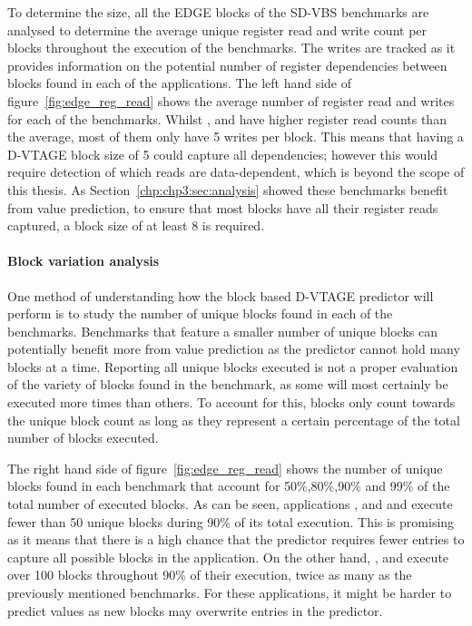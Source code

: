 To determine the size, all the EDGE blocks of the SD-VBS benchmarks are analysed to determine the average unique register read and write count per blocks throughout the execution of the benchmarks.
The writes are tracked as it provides information on the potential number of register dependencies between blocks found in each of the applications.
The left hand side of figure~\ref{fig:edge_reg_read} shows the average number of register read and writes for each of the benchmarks.
Whilst  ,  and  have higher register read counts than the average, most of them only have 5 writes per block.
This means that having a D-VTAGE block size of 5 could capture all dependencies; however this would require detection of which reads are data-dependent, which is beyond the scope of this thesis.
As Section~\ref{chp:chp3:sec:analysis} showed these benchmarks benefit from value prediction, to ensure that most blocks have all their register reads captured, a block size of at least 8 is required.

\paragraph*{Block variation analysis}



One method of understanding how the block based D-VTAGE predictor will perform is to study the number of unique blocks found in each of the benchmarks.
Benchmarks that feature a smaller number of unique blocks can potentially benefit more from value prediction as the predictor cannot hold many blocks at a time.
Reporting all unique blocks executed is not a proper evaluation of the variety of blocks found in the benchmark, as some will most certainly be executed more times than others.
To account for this, blocks only count towards the unique block count as long as they represent a certain percentage of the total number of blocks executed.

The right hand side of figure~\ref{fig:edge_reg_read} shows the number of unique blocks found in each benchmark that account for 50\%,80\%,90\% and 99\% of the total number of executed blocks.
As can be seen, applications ,  and   and  execute fewer than 50 unique blocks during 90\% of its total execution.
This is promising as it means that there is a high chance that the predictor requires fewer entries to capture all possible blocks in the application.
On the other hand, , and  execute over 100 blocks throughout 90\% of their execution, twice as many as the previously mentioned benchmarks.
For these applications, it might be harder to predict values as new blocks may overwrite entries in the predictor.

